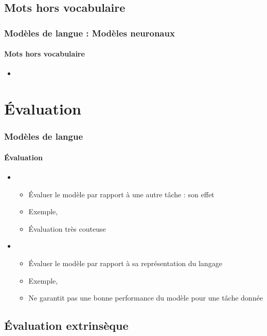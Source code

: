 \documentclass[xcolor=table]{beamer}
\begin{document}
\subsection{Mots hors vocabulaire}

\begin{frame}
\frametitle{Modèles de langue : Modèles neuronaux}
\framesubtitle{Mots hors vocabulaire}

\begin{itemize}
	\item 
\end{itemize}

\end{frame}

\section{Évaluation}

\begin{frame}
\frametitle{Modèles de langue}
\framesubtitle{Évaluation}

\begin{itemize}
	\item {}
	\begin{itemize}
		\item Évaluer le modèle par rapport à une autre tâche : son effet
		\item Exemple,  
		\item Évaluation très couteuse
	\end{itemize}
	\item {}
	\begin{itemize}
		\item Évaluer le modèle par rapport à sa représentation du langage
		\item Exemple,  
		\item Ne garantit pas une bonne performance du modèle pour une tâche donnée
	\end{itemize}
\end{itemize}

\end{frame}

\subsection{Évaluation extrinsèque}
\end{document}
